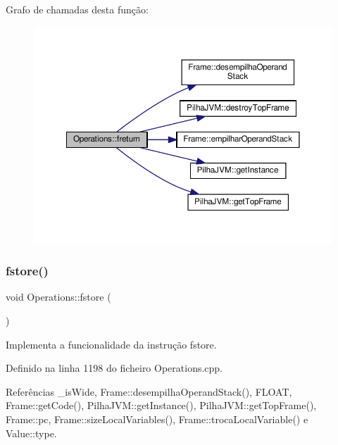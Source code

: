 Grafo de chamadas desta função\+:
\nopagebreak
\begin{figure}[H]
\begin{center}
\leavevmode
\includegraphics[width=350pt]{classOperations_a701431fe6d5d20fafa747dbeae90e1d4_cgraph}
\end{center}
\end{figure}
\mbox{\label{classOperations_a42a0b3220b593059320cf7d5a5eed6e2}} 
\subsubsection{\texorpdfstring{fstore()}{fstore()}}
{\footnotesize\ttfamily void Operations\+::fstore (\begin{DoxyParamCaption}{ }\end{DoxyParamCaption})\hspace{0.3cm}{\ttfamily [private]}}



Implementa a funcionalidade da instrução fstore. 



Definido na linha 1198 do ficheiro Operations.\+cpp.



Referências \+\_\+is\+Wide, Frame\+::desempilha\+Operand\+Stack(), F\+L\+O\+AT, Frame\+::get\+Code(), Pilha\+J\+V\+M\+::get\+Instance(), Pilha\+J\+V\+M\+::get\+Top\+Frame(), Frame\+::pc, Frame\+::size\+Local\+Variables(), Frame\+::troca\+Local\+Variable() e Value\+::type.



